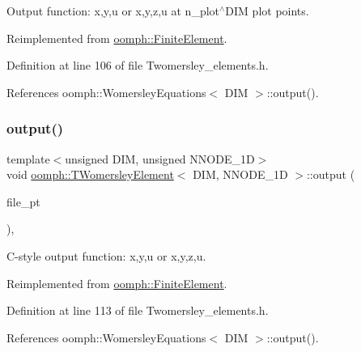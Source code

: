 Output function\+: x,y,u or x,y,z,u at n\+\_\+plot$^\wedge$\+D\+IM plot points. 



Reimplemented from \hyperlink{classoomph_1_1FiniteElement_afa9d9b2670f999b43e6679c9dd28c457}{oomph\+::\+Finite\+Element}.



Definition at line 106 of file Twomersley\+\_\+elements.\+h.



References oomph\+::\+Womersley\+Equations$<$ D\+I\+M $>$\+::output().

\mbox{\label{classoomph_1_1TWomersleyElement_a9ff6ea219c58419d6c487dc14d1e3b7e}} 
\subsubsection{\texorpdfstring{output()}{output()}\hspace{0.1cm}{\footnotesize\ttfamily [3/4]}}
{\footnotesize\ttfamily template$<$unsigned D\+IM, unsigned N\+N\+O\+D\+E\+\_\+1D$>$ \\
void \hyperlink{classoomph_1_1TWomersleyElement}{oomph\+::\+T\+Womersley\+Element}$<$ D\+IM, N\+N\+O\+D\+E\+\_\+1D $>$\+::output (\begin{DoxyParamCaption}\item[{F\+I\+LE $\ast$}]{file\+\_\+pt }\end{DoxyParamCaption})\hspace{0.3cm}{\ttfamily [inline]}, {\ttfamily [virtual]}}



C-\/style output function\+: x,y,u or x,y,z,u. 



Reimplemented from \hyperlink{classoomph_1_1FiniteElement_a72cddd09f8ddbee1a20a1ff404c6943e}{oomph\+::\+Finite\+Element}.



Definition at line 113 of file Twomersley\+\_\+elements.\+h.



References oomph\+::\+Womersley\+Equations$<$ D\+I\+M $>$\+::output().

\mbox{\label{classoomph_1_1TWomersleyElement_af96702fecfe94145a5af02bb4037b608}} 
